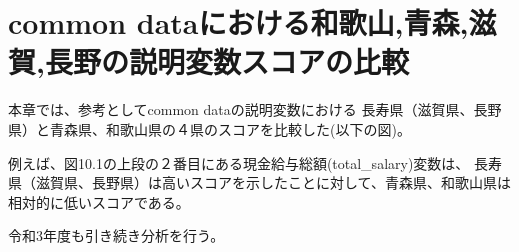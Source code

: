 %
%
%






\chapter{common dataにおける和歌山,青森,滋賀,長野の説明変数スコアの比較}

本章では、参考としてcommon dataの説明変数における
長寿県（滋賀県、長野県）と青森県、和歌山県の４県のスコアを比較した(以下の図)。

例えば、図10.1の上段の２番目にある現金給与総額(total\_salary)変数は、
長寿県（滋賀県、長野県）は高いスコアを示したことに対して、青森県、和歌山県は相対的に低いスコアである。

令和3年度も引き続き分析を行う。

